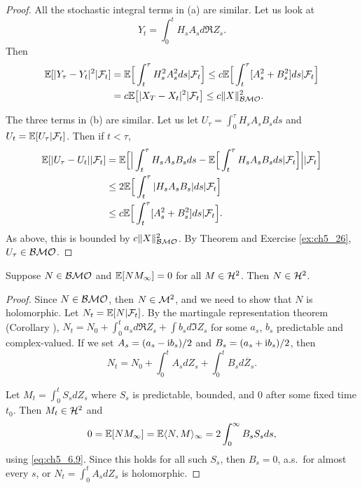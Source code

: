 \begin{proof}
All the stochastic integral terms in (a) are similar. Let us look at
\[
    Y_t = \int_0^t H_sA_sd\Re Z_s.
\]
Then
\begin{align*}
    \mathbb{E}[|Y_\tau - Y_t|^2| \mathcal{F}_t] &= \mathbb{E}\Big[\int_t^\tau H_s^2A_s^2ds|\mathcal{F}_t\Big] \leq c\mathbb{E}\Big[\int_t^\tau [A_s^2 + B_s^2]ds|\mathcal{F}_t\Big] \\
    &= c\mathbb{E}\big[|X_T - X_t|^2| \mathcal{F}_t\big] \leq c\|X\|^2_{\mathcal{BMO}}.
\end{align*}

The three terms in (b) are similar. Let us let $U_\tau = \int_0^\tau H_sA_sB_sds$ and $U_t = \mathbb{E}[U_\tau| \mathcal{F}_t]$. Then if $t < \tau$,
\begin{align*}
    \mathbb{E}[|U_\tau - U_t|| \mathcal{F}_t] &= \mathbb{E}\Big[\Big|\int_t^\tau H_sA_sB_sds - \mathbb{E}\Big[\int_t^\tau H_sA_sB_sds| \mathcal{F}_t\Big]\Big|| \mathcal{F}_t\Big] \\
    &\leq 2\mathbb{E}\Big[\int_t^\tau |H_sA_sB_s|ds| \mathcal{F}_t\Big] \\
    &\leq c\mathbb{E}\Big[\int_t^\tau [A_s^2 + B_s^2]ds| \mathcal{F}_t\Big].
\end{align*}
As above, this is bounded by $c\|X\|^2_{\mathcal{BMO}}$. By Theorem  and Exercise \ref{ex:ch5_26}, $U_\tau \in \mathcal{BMO}$.
\end{proof}

\begin{lemma}\label{lem:ch5_6.10}
Suppose $N \in \mathcal{BMO}$ and $\mathbb{E}[NM_\infty] = 0$ for all $M \in \mathcal{H}^2$. Then $N \in \mathcal{H}^2$.
\end{lemma}

\begin{proof}
Since $N \in \mathcal{BMO}$, then $N \in \mathcal{M}^2$, and we need to show that $N$ is holomorphic. Let $N_t = \mathbb{E}[N| \mathcal{F}_t]$. By the martingale representation theorem (Corollary ), $N_t = N_0 + \int_0^t a_sd\Re Z_s + \int b_sd\Im Z_s$ for some $a_s$, $b_s$ predictable and complex-valued. If we set $A_s = (a_s - \mathrm{i} b_s)/2$ and $B_s = (a_s + \mathrm{i} b_s)/2$, then
\[
    N_t = N_0 + \int_0^t A_sdZ_s + \int_0^t B_sd\overline{Z}_s.
\]

Let $M_t = \int_0^t S_sdZ_s$ where $S_s$ is predictable, bounded, and $0$ after some fixed time $t_0$. Then $M_t \in \mathcal{H}^2$ and
\[
    0 = \mathbb{E}[NM_\infty] = \mathbb{E}\langle N,M \rangle_\infty = 2\int_0^\infty B_sS_sds,
\]
using \eqref{eq:ch5_6.9}. Since this holds for all such $S_s$, then $B_s = 0$, a.s.\ for almost every $s$, or $N_t = \int_0^t A_sdZ_s$ is holomorphic.
\end{proof}


